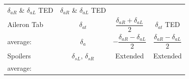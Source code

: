 \documentclass[
]{book}
\begin{document}
\begin{longtable}[]{@{}lccc@{}}
\begin{minipage}[t]{0.29\columnwidth}
\(\delta_{aR}\) \& \(\delta_{aL}\) TED\strut
\end{minipage} & \begin{minipage}[t]{0.27\columnwidth}\centering
\(\delta_{aR}\) \& \(\delta_{aL}\) TED\strut
\end{minipage}\tabularnewline
\begin{minipage}[t]{0.19\columnwidth}\raggedright
Aileron Tab\strut
\end{minipage} & \begin{minipage}[t]{0.14\columnwidth}\centering
\(\delta_{at}\)\strut
\end{minipage} & \begin{minipage}[t]{0.29\columnwidth}\centering
\[\frac{\delta_{aR}+\delta_{aL}}{2}\]\strut
\end{minipage} & \begin{minipage}[t]{0.27\columnwidth}\centering
\(\delta_{at}\) TED\strut
\end{minipage}\tabularnewline
\begin{minipage}[t]{0.19\columnwidth}\raggedright
average:\strut
\end{minipage} & \begin{minipage}[t]{0.14\columnwidth}\centering
\(\delta_{a}\)\strut
\end{minipage} & \begin{minipage}[t]{0.29\columnwidth}\centering
\[-\frac{\delta_{aR} - \delta_{aL}}{2}\]\strut
\end{minipage} & \begin{minipage}[t]{0.27\columnwidth}\centering
\[\frac{\delta_{aR} - \delta_{aL}}{2}\]\strut
\end{minipage}\tabularnewline
\begin{minipage}[t]{0.19\columnwidth}\raggedright
Spoilers\strut
\end{minipage} & \begin{minipage}[t]{0.14\columnwidth}\centering
\(\delta_{sL}\),
\(\delta_{sR}\)\strut
\end{minipage} & \begin{minipage}[t]{0.29\columnwidth}\centering
Extended\strut
\end{minipage} & \begin{minipage}[t]{0.27\columnwidth}\centering
Extended\strut
\end{minipage}\tabularnewline
\begin{minipage}[t]{0.19\columnwidth}\raggedright
average:\strut
\end{minipage} & \begin{minipage}[t]{0.14\columnwidth}\centering

\end{minipage}
\end{longtable}
\end{document}
